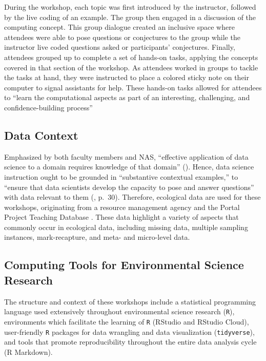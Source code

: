 \documentclass[12pt]{article}
\begin{document}
During the workshop, each topic was first introduced by the instructor, 
followed by the live coding of an example. The group then engaged in a
discussion of the computing concept. This group dialogue created an inclusive
space where attendees were able to pose questions or conjectures to the group
while the instructor live coded questions asked or participants' conjectures.
Finally, attendees grouped up to complete a set of hands-on tasks, applying the
concepts covered in that section of the workshop. As
attendees worked in groups to tackle the tasks at hand, they were instructed to
place a colored sticky note on their computer to signal assistants for help.
These hands-on tasks allowed
for attendees to ``learn the computational aspects as part of an interesting,
challenging, and confidence-building process'' \citep[p.\ 101]{nolan}

\subsection{Data Context}  

\noindent Emphasized by both faculty members and NAS, ``effective
application of data science to a domain requires knowledge of that domain'' 
(\citeyear[p.\ 29]{nas}). Hence, data science instruction ought to be grounded
in ``substantive contextual examples,'' to ``ensure that data scientists develop
the capacity to pose and answer questions'' with data relevant to them
(\citeyear{nas}, p.\ 30). Therefore, ecological data are used for these
workshops, originating from a resource management agency and the
Portal Project Teaching Database \citep{portal_data}.  
These data highlight a variety of aspects that
commonly occur in ecological data, including missing data, multiple sampling instances,
mark-recapture, and meta- and micro-level data. 

\subsection{Computing Tools for Environmental Science Research}  

\noindent The structure and context of these workshops include a statistical
programming language used extensively throughout environmental science research
(\texttt{R}), environments which facilitate the learning of \texttt{R}
(RStudio and RStudio Cloud), user-friendly \texttt{R} packages for data
wrangling and data visualization (\texttt{tidyverse}), and tools that promote
reproducibility throughout the entire data analysis cycle (R Markdown).
\end{document}

